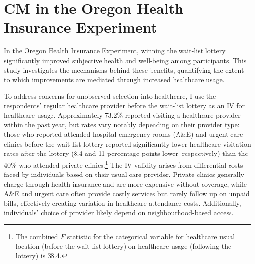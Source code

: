\section{CM in the Oregon Health Insurance Experiment}
\label{sec:oregon}
In the Oregon Health Insurance Experiment, winning the wait-list lottery significantly improved subjective health and well-being among participants. 
This study investigates the mechanisms behind these benefits, quantifying the extent to which improvements are mediated through increased healthcare usage.

To address concerns for unobserved selection-into-healthcare, I use the respondents' regular healthcare provider before the wait-list lottery as an IV for healthcare usage.
Approximately 73.2\% reported visiting a healthcare provider within the past year, but rates vary notably depending on their provider type: those who reported attended hospital emergency rooms (A\&E) and urgent care clinics before the wait-list lottery reported significantly lower healthcare visitation rates after the lottery (8.4 and 11 percentage points lower, respectively) than the 40\% who attended private clinics.\footnote{
    The combined $F$ statistic for the categorical variable for healthcare usual location (before the wait-list lottery) on healthcare usage (following the lottery) is 38.4.
}
The IV validity arises from differential costs faced by individuals based on their usual care provider.
Private clinics generally charge through health insurance and are more expensive without coverage, while A\&E and urgent care often provide costly services but rarely follow up on unpaid bills, effectively creating variation in healthcare attendance costs.
Additionally, individuals' choice of provider likely depend on neighbourhood-based access.

